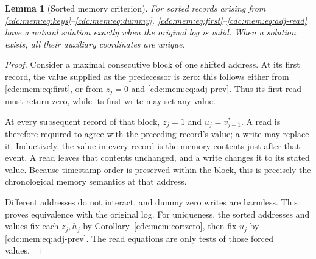 \documentclass[11pt,a4paper]{article}
\newtheorem{lemma}[lemma]{Lemma}
\theoremstyle{definition}
\theoremstyle{remark}
\begin{document}
\begin{lemma}[Sorted memory criterion]\label{cdc:mem:lem:local-memory}
For sorted records arising from \eqref{cdc:mem:eq:keys}--\eqref{cdc:mem:eq:dummy},
\eqref{cdc:mem:eq:first}--\eqref{cdc:mem:eq:adj-read} have a natural solution exactly when the
original log is valid. When a solution exists, all their auxiliary coordinates
are unique.
\end{lemma}
\begin{proof}
Consider a maximal consecutive block of one shifted address. At its first
record, the value supplied as the predecessor is zero: this follows either
from \eqref{cdc:mem:eq:first}, or from $z_j=0$ and \eqref{cdc:mem:eq:adj-prev}. Thus its first
read must return zero, while its first write may set any value.

At every subsequent record of that block, $z_j=1$ and $u_j=v_{j-1}^*$. A read
is therefore required to agree with the preceding record's value; a write may
replace it. Inductively, the value in every record is the memory contents just
after that event. A read leaves that contents unchanged, and a write changes
it to its stated value. Because timestamp order is preserved within the block,
this is precisely the chronological memory semantics at that address.

Different addresses do not interact, and dummy zero writes are harmless. This
proves equivalence with the original log. For uniqueness, the sorted addresses
and values fix each $z_j,h_j$ by Corollary~\ref{cdc:mem:cor:zero}, then fix $u_j$ by
\eqref{cdc:mem:eq:adj-prev}. The read equations are only tests of those forced values.
\end{proof}
\end{document}
